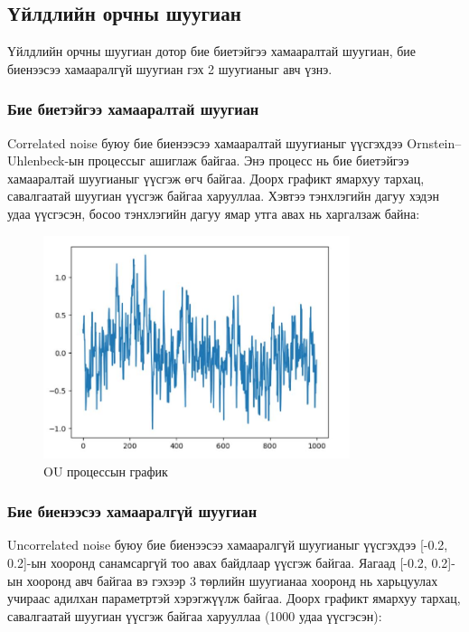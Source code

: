 \documentclass[12pt,A4]{report}
\begin{document}
\subsection{Үйлдлийн орчны шуугиан}

Үйлдлийн орчны шуугиан дотор бие биетэйгээ хамааралтай шуугиан, бие биенээсээ хамааралгүй шуугиан гэх 2 шуугианыг авч үзнэ.

\subsubsection{Бие биетэйгээ хамааралтай шуугиан}

Correlated noise буюу бие биенээсээ хамааралтай шуугианыг үүсгэхдээ Ornstein–Uhlenbeck-ын процессыг ашиглаж байгаа. Энэ процесс нь бие биетэйгээ хамааралтай шуугианыг үүсгэж өгч байгаа. Доорх графикт ямархуу тархац, савалгаатай шуугиан үүсгэж байгаа харууллаа. Хэвтээ тэнхлэгийн дагуу хэдэн удаа үүсгэсэн, босоо тэнхлэгийн дагуу ямар утга авах нь харгалзаж байна:

\begin{figure}[H]
\centering
\includegraphics[width=0.8\textwidth]{./images/OU_process_graph}
\caption{OU процессын график}
\end{figure}

\subsubsection{Бие биенээсээ хамааралгүй шуугиан}

Uncorrelated noise буюу бие биенээсээ хамааралгүй шуугианыг үүсгэхдээ [-0.2, 0.2]-ын хооронд санамсаргүй тоо авах байдлаар үүсгэж байгаа. Яагаад [-0.2, 0.2]-ын хооронд авч байгаа вэ гэхээр 3 төрлийн шуугианаа хооронд нь харьцуулах учираас адилхан параметртэй хэрэгжүүлж байгаа. Доорх графикт ямархуу тархац, савалгаатай шуугиан үүсгэж байгаа харууллаа (1000 удаа үүсгэсэн):
\end{document}
